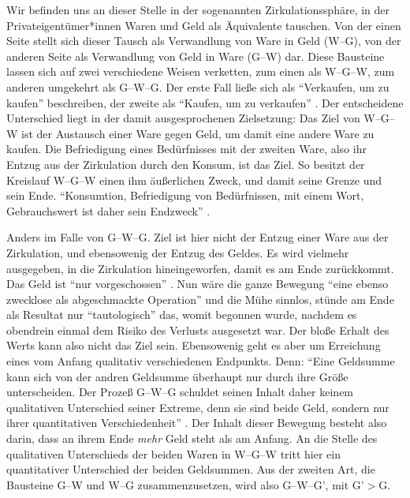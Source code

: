 \documentclass[12pt,
               DIV13,
               paper=a4,
               twoside=false,
               onehalfspacing,
               bibliography=totoc,
               toc=graduated,
               draft,
               ]{scrartcl}
\newcommand{\pc}[2]{\parencite[#1]{#2}}
\newcommand{\vgl}[2]{\parencite[vgl.][#1]{#2}}
\newcommand{\gwg}{G--W--G'\xspace}
\newcommand{\wgw}{W--G--W\xspace}
\begin{document}


Wir befinden uns an dieser Stelle in der sogenannten
Zirkulationssphäre, in der Privateigentümer*innen Waren und Geld als
Äquivalente tauschen. Von der einen Seite stellt sich dieser Tausch
als Verwandlung von Ware in Geld (W--G), von der anderen Seite als
Verwandlung von Geld in Ware (G--W) dar. Diese Bausteine lassen sich
auf zwei verschiedene Weisen verketten, zum einen als \wgw, zum
anderen umgekehrt als G--W--G. Der erste Fall ließe sich als
"`Verkaufen, um zu kaufen"' beschreiben, der zweite als "`Kaufen, um
zu verkaufen"' \vgl{162}{kap}. Der entscheidene Unterschied liegt in
der damit ausgesprochenen Zielsetzung: Das Ziel von \wgw ist der
Austausch einer Ware gegen Geld, um damit eine andere Ware zu kaufen.
Die Befriedigung eines Bedürfnisses mit der zweiten Ware, also ihr
Entzug aus der Zirkulation durch den Konsum, ist das Ziel. So besitzt
der Kreislauf \wgw einen ihm äußerlichen Zweck, und damit seine Grenze
und sein Ende. "`Konsumtion, Befriedigung von Bedürfnissen, mit einem
Wort, Gebrauchswert ist daher sein Endzweck"' \pc{164}{kap}.


Anders im Falle von G--W--G. Ziel ist hier nicht der Entzug einer Ware
aus der Zirkulation, und ebensowenig der Entzug des Geldes. Es wird
vielmehr ausgegeben, in die Zirkulation hineingeworfen, damit es am
Ende zurückkommt. Das Geld ist "`nur vorgeschossen"' \pc{163}{kap}.
Nun wäre die ganze Bewegung "`eine ebenso zwecklose als abgeschmackte
Operation"' \pc{165}{kap} und die Mühe sinnlos, stünde am Ende als
Resultat nur "`tautologisch"' \pc{164}{kap} das, womit begonnen wurde,
nachdem es obendrein einmal dem Risiko des Verlusts ausgesetzt war.
Der bloße Erhalt des Werts kann also nicht das Ziel sein. Ebensowenig
geht es aber um Erreichung eines vom Anfang qualitativ verschiedenen
Endpunkts. Denn: "`Eine Geldsumme kann sich von der andren Geldsumme
überhaupt nur durch ihre Größe unterscheiden. Der Prozeß G--W--G
schuldet seinen Inhalt daher keinem qualitativen Unterschied seiner
Extreme, denn sie sind beide Geld, sondern nur ihrer quantitativen
Verschiedenheit"' \pc{165}{kap}. Der Inhalt dieser Bewegung besteht
also darin, dass an ihrem Ende \emph{mehr} Geld steht als am Anfang.
An die Stelle des qualitativen Unterschieds der beiden Waren in \wgw
tritt hier ein quantitativer Unterschied der beiden Geldsummen. Aus
der zweiten Art, die Bausteine G--W und W--G zusammenzusetzen, wird
also \gwg, mit G'$>$G.
\end{document}
